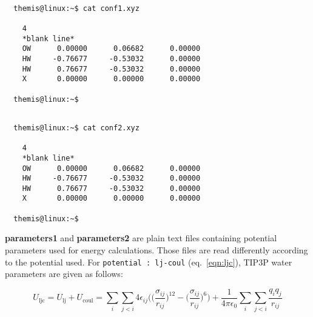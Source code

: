 \documentclass{achemso}
\begin{document}
\begin{center}
  \begin{minipage}{0.425\textwidth}
    \begin{verbatim}

  themis@linux:~$ cat conf1.xyz 

    4 
    *blank line*
    OW      0.00000      0.06682      0.00000
    HW     -0.76677     -0.53032      0.00000
    HW      0.76677     -0.53032      0.00000
    X       0.00000      0.00000      0.00000

  themis@linux:~$ 

    \end{verbatim}
    \vskip0.5cm
  \end{minipage}%
%
  \hskip1.0cm
%
  \begin{minipage}{0.425\textwidth}
    \begin{verbatim}

  themis@linux:~$ cat conf2.xyz 

    4 
    *blank line*
    OW      0.00000      0.06682      0.00000
    HW     -0.76677     -0.53032      0.00000
    HW      0.76677     -0.53032      0.00000
    X       0.00000      0.00000      0.00000

  themis@linux:~$

    \end{verbatim}
    \vskip0.5cm
  \end{minipage}%
\end{center}


\textbf{parameters1} and \textbf{parameters2} are plain text files containing
potential parameters used for energy calculations. Those files are read differently 
according to the potential used. For \texttt{potential : lj-coul} (eq.~\ref{eqn:ljc}), 
TIP3P water parameters are given as follows:

\begin{equation}
  \label{eqn:ljc}
  U_{\textrm{ljc}} = U_{\textrm{lj}} + U_{\textrm{coul}} = 
  \sum\limits_{i} \sum\limits_{j<i}4\epsilon_{ij}\bigg(\bigg(\frac{\sigma_{ij}}{r_{ij}}\bigg)^{\!\!12}
  -\bigg(\frac{\sigma_{ij}}{r_{ij}}\bigg)^{\!\!6}\bigg)
	+\frac{1}{4\pi\epsilon_{0}}\sum\limits_{i} \sum\limits_{j<i}\frac{q_{i}q_{j}}{r_{ij}}
\end{equation}
\end{document}
